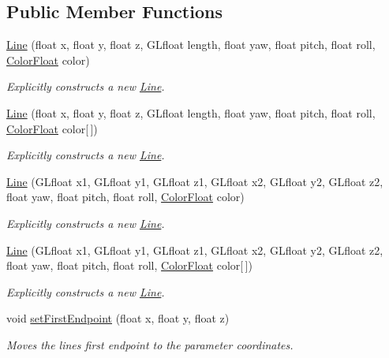 \subsection*{Public Member Functions}
\begin{DoxyCompactItemize}
\item 
\hyperlink{classtsgl_1_1_line_af139d320a5f9dfb1954e85a35c37ba0a}{Line} (float x, float y, float z, G\+Lfloat length, float yaw, float pitch, float roll, \hyperlink{structtsgl_1_1_color_float}{Color\+Float} color)
\begin{DoxyCompactList}\small\item\em Explicitly constructs a new \hyperlink{classtsgl_1_1_line}{Line}. \end{DoxyCompactList}\item 
\hyperlink{classtsgl_1_1_line_acc8263acc177535010a01cbf3d84c40b}{Line} (float x, float y, float z, G\+Lfloat length, float yaw, float pitch, float roll, \hyperlink{structtsgl_1_1_color_float}{Color\+Float} color\mbox{[}$\,$\mbox{]})
\begin{DoxyCompactList}\small\item\em Explicitly constructs a new \hyperlink{classtsgl_1_1_line}{Line}. \end{DoxyCompactList}\item 
\hyperlink{classtsgl_1_1_line_ac7bfc45833192e51011439525c0faba5}{Line} (G\+Lfloat x1, G\+Lfloat y1, G\+Lfloat z1, G\+Lfloat x2, G\+Lfloat y2, G\+Lfloat z2, float yaw, float pitch, float roll, \hyperlink{structtsgl_1_1_color_float}{Color\+Float} color)
\begin{DoxyCompactList}\small\item\em Explicitly constructs a new \hyperlink{classtsgl_1_1_line}{Line}. \end{DoxyCompactList}\item 
\hyperlink{classtsgl_1_1_line_a194016528aab93f043eb3abbda11c016}{Line} (G\+Lfloat x1, G\+Lfloat y1, G\+Lfloat z1, G\+Lfloat x2, G\+Lfloat y2, G\+Lfloat z2, float yaw, float pitch, float roll, \hyperlink{structtsgl_1_1_color_float}{Color\+Float} color\mbox{[}$\,$\mbox{]})
\begin{DoxyCompactList}\small\item\em Explicitly constructs a new \hyperlink{classtsgl_1_1_line}{Line}. \end{DoxyCompactList}\item 
void \hyperlink{classtsgl_1_1_line_ac000cf214382a69cd37010d5d04fe6ba}{set\+First\+Endpoint} (float x, float y, float z)
\begin{DoxyCompactList}\small\item\em Moves the line\textquotesingle{}s first endpoint to the parameter coordinates. \end{DoxyCompactList}\item 

\end{DoxyCompactItemize}
